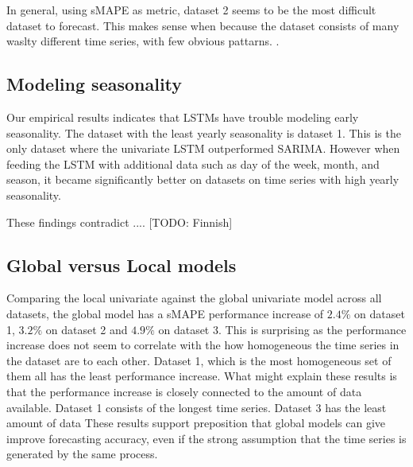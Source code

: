 
In general, using sMAPE as metric, dataset 2 seems to be the most difficult dataset to forecast.
This makes sense when because the dataset consists of many waslty different time series,
with few obvious pattarns.
.


\subsection{Modeling seasonality}
Our empirical results indicates that LSTMs have trouble modeling early seasonality.
The dataset with the least yearly seasonality is dataset 1. This is the only dataset where
the univariate LSTM outperformed SARIMA. However when feeding the LSTM with additional
data such as day of the week, month, and season, it became significantly better on datasets
on time series with high yearly seasonality.

These findings contradict \cite[]{Hewamalage2021}.... [TODO: Finnish]




\subsection{Global versus Local models}
Comparing the local univariate against the global univariate model across all datasets,
the global model has a sMAPE performance increase of $2.4\%$ on dataset 1, $3.2\%$ on dataset 2 and
$4.9\%$ on dataset 3. This is surprising as the performance increase does not seem to correlate
with the how homogeneous the time series in the dataset are to each other.
Dataset 1, which is the most homogeneous set of them all has the least performance increase.
What might explain these results is that the performance increase is closely connected to the amount
of data available. Dataset 1 consists of the longest time series.
Dataset 3 has the least amount of data
These results support \cite[]{Montero-Manso2021} preposition that global models can give
improve forecasting accuracy, even if the strong assumption that the time series
is generated by the same process.

